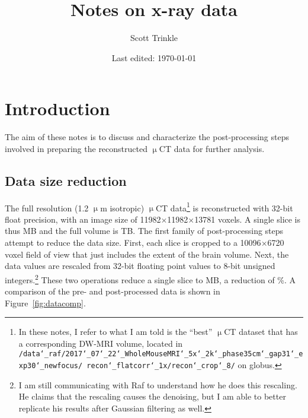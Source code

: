 \documentclass[11pt]{article}
\title{Notes on x-ray data}
\author{Scott Trinkle}
\date{Last edited: \today}
\begin{document}
\maketitle

\section{Introduction}

The aim of these notes is to discuss and characterize the post-processing steps
involved in preparing the reconstructed $\upmu$CT data for further analysis.

\subsection{Data size reduction}
The full resolution (1.2 $\upmu$m isotropic) $\upmu$CT data\footnote{In these
notes, I refer to what I am told is the ``best'' $\upmu$CT dataset that has a
corresponding DW-MRI volume, located in
\texttt{/data\char`_raf/2017\char`_07\char`_22\char`_WholeMouseMRI\char`_5x\char`_2k\char`_phase35cm\char`_gap31\char`_exp30\char`_newfocus/
  recon\char`_flatcorr\char`_1x/recon\char`_crop\char`_8/} \newline on globus.}
is reconstructed with 32-bit float precision, with an image size of
11982$\times$11982$\times$13781 voxels. A single slice is thus 
MB and the full volume is  TB. The first family of
post-processing steps attempt to reduce the data size. First, each slice is
cropped to a 10096$\times$6720 voxel field of view that just includes the extent
of the brain volume. Next, the data values are rescaled from 32-bit floating
point values to 8-bit unsigned integers.\footnote{I am still communicating with
  Raf to understand how he does this rescaling. He claims that the rescaling
  causes the denoising, but I am able to better replicate his results after
  Gaussian filtering as well.} These two operations reduce a single slice to
 MB, a reduction of \%. A comparison of the pre- and
post-processed data is shown in Figure~\ref{fig:datacomp}.
\end{document}
